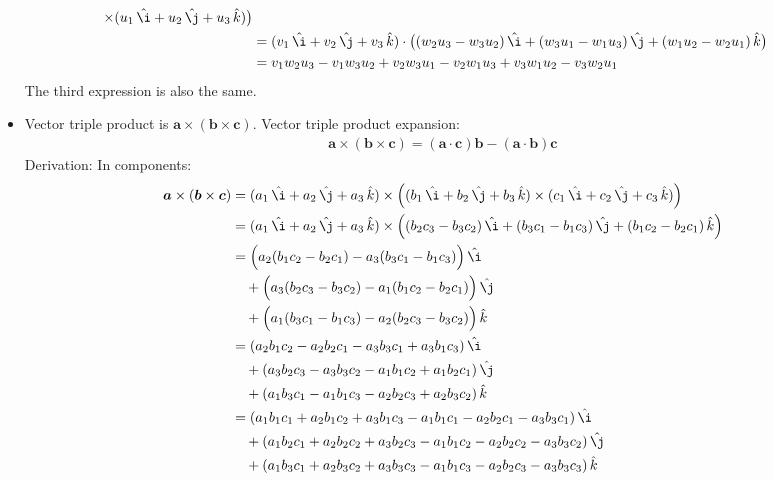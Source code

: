 \documentclass{article}
\renewcommand{\vec}[1]{\boldsymbol{#1}}
\newcommand{\unit}[1]{\,\hat{#1}}
\begin{document}
\begin{itemize}
\begin{align}
    \times (u_1 \unit{\i} + u_2 \unit{\j} + u_3 \unit{k}) \big) \\
    &= (v_1 \unit{\i} + v_2 \unit{\j} + v_3 \unit{k}) \cdot \big(
    (w_2 u_3 - w_3 u_2) \unit{\i}
    + (w_3 u_1 - w_1 u_3) \unit{\j}
    + (w_1 u_2 - w_2 u_1) \unit{k} \big) \\
    &= v_1 w_2 u_3 - v_1 w_3 u_2
    + v_2 w_3 u_1 - v_2 w_1 u_3
    + v_3 w_1 u_2 - v_3 w_2 u_1
  \end{align}
  The third expression is also the same.
\item Vector triple product is $\vec{a} \times (\vec{b} \times
  \vec{c})$. Vector triple product expansion:
  \begin{align}
    \vec{a} \times (\vec{b} \times \vec{c})
    = (\vec{a} \cdot \vec{c}) \vec{b} - (\vec{a} \cdot \vec{b}) \vec{c}
  \end{align}
  Derivation: In components:
  \begin{align}
    \vec{a} \times (\vec{b} \times \vec{c})
    &= (a_1 \unit{\i} + a_2 \unit{\j} + a_3 \unit{k})
    \times \Big(
    (b_1 \unit{\i} + b_2 \unit{\j} + b_3 \unit{k})
    \times (c_1 \unit{\i} + c_2 \unit{\j} + c_3 \unit{k}) \Big) \\
    &= (a_1 \unit{\i} + a_2 \unit{\j} + a_3 \unit{k})
    \times \Big(
    (b_2 c_3 - b_3 c_2) \unit{\i}
    + (b_3 c_1 - b_1 c_3) \unit{\j}
    + (b_1 c_2 - b_2 c_1) \unit{k} \Big) \\
    &= \Big(a_2 (b_1 c_2 - b_2 c_1) - a_3 (b_3 c_1 - b_1 c_3)\Big) \unit{\i} \\
    &\quad+ \Big(a_3 (b_2 c_3 - b_3 c_2) - a_1 (b_1 c_2 - b_2 c_1)\Big) \unit{\j} \\
    &\quad+ \Big(a_1 (b_3 c_1 - b_1 c_3) - a_2 (b_2 c_3 - b_3 c_2)\Big) \unit{k} \\
    &= (a_2 b_1 c_2 - a_2 b_2 c_1 - a_3 b_3 c_1 + a_3 b_1 c_3) \unit{\i} \\
    &\quad+ (a_3 b_2 c_3 - a_3 b_3 c_2 - a_1 b_1 c_2 + a_1 b_2 c_1) \unit{\j} \\
    &\quad+ (a_1 b_3 c_1 - a_1 b_1 c_3 - a_2 b_2 c_3 + a_2 b_3 c_2) \unit{k} \\
    &= (a_1 b_1 c_1 + a_2 b_1 c_2 + a_3 b_1 c_3 - a_1 b_1 c_1 - a_2 b_2 c_1 - a_3 b_3 c_1) \unit{\i} \\
    &\quad+ (a_1 b_2 c_1 + a_2 b_2 c_2 + a_3 b_2 c_3 - a_1 b_1 c_2 - a_2 b_2 c_2 - a_3 b_3 c_2) \unit{\j} \\
    &\quad+ (a_1 b_3 c_1 + a_2 b_3 c_2 + a_3 b_3 c_3 - a_1 b_1 c_3 - a_2 b_2 c_3 - a_3 b_3 c_3) \unit{k} \\

\end{align}
\end{itemize}
\end{document}
